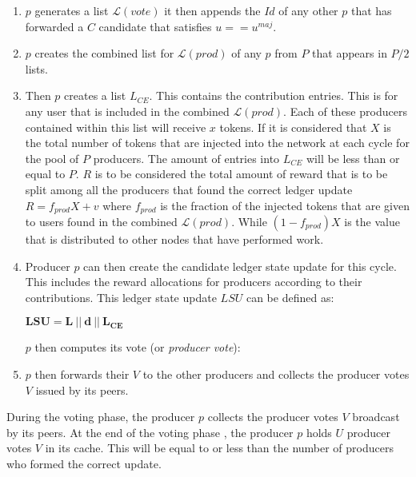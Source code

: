 \begin{enumerate}
\item $p$ generates a list $\mathcal{L}(vote)$ it then appends the $Id$ of any other $p$ that has forwarded a $C$ candidate that satisfies $u == u^{maj}$.
\item $p$ creates the combined list for $\mathcal{L}(prod)$ of any $p$ from $P$ that appears in $P/2$ lists.
\item Then $p$ creates a list $L_{CE}$. This contains the contribution entries. This is for any user that is included in the combined $\mathcal{L}(prod)$. Each of these producers contained within this list will receive $x$ tokens. If it is considered that $X$ is the total number of tokens that are injected into the network at each cycle for the pool of $P$ producers. The amount of entries into $L_{CE}$ will be less than or equal to $P$. $R$ is to be considered the total amount of reward that is to be split among all the producers that found the correct ledger update $R = f_{prod}X + v$ where $f_{prod}$ is the fraction of the injected tokens that are given to users found in the combined $\mathcal{L}(prod)$. While $(1-f_{prod})X$ is the value that is distributed to other nodes that have performed work.
\item Producer $p$ can then create the candidate ledger state update for this cycle. This includes the reward allocations for producers according to their contributions. This ledger state update $LSU$ can be defined as:

\begin{center}
$\mathbf{LSU = L~||~d~||~L_{CE}}$
\end{center}


$p$ then computes its vote (or \textit{producer vote}):
\begin{center}
\end{center}


\item $p$ then forwards their $V$ to the other producers and collects the producer votes $V$ issued by its peers.

\end{enumerate}


During the voting phase, the producer $p$ collects the producer votes $V$ broadcast by its peers. At the end of the voting phase , the producer $p$ holds $U$ producer votes $V$ in its cache. This will be equal to or less than the number of producers who formed the correct update.

